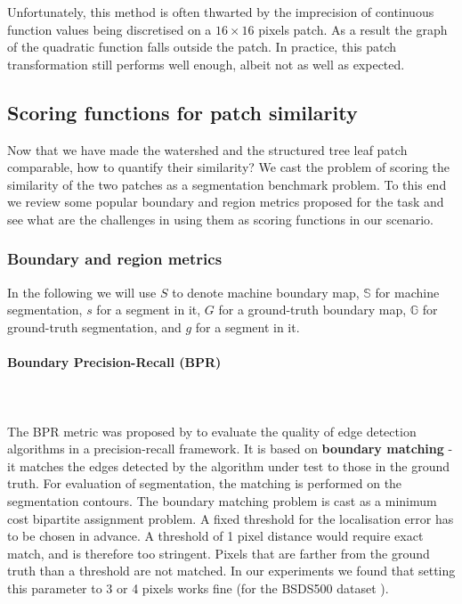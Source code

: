 Unfortunately, this method is often thwarted by the imprecision of continuous function values being discretised on a $16\times 16$ pixels patch. %
As a result the graph of the quadratic function falls outside the patch. In practice, this patch transformation still performs well enough, albeit not as well as expected.

\subsection{Scoring functions for patch similarity}
Now that we have made the watershed and the structured tree leaf patch comparable, how to quantify their similarity? 
We cast the problem of scoring the similarity of the two patches as a segmentation benchmark problem. To this end we review some popular boundary and region metrics proposed for the task and see what are the challenges in using them as scoring functions in our scenario.

\subsubsection{Boundary and region metrics}
\label{sec:ch4-boundary-and-region-metrics-maths}
In the following we will use $S$ to denote machine boundary map, $\mathbb{S}$ for machine segmentation, $s$ for a segment in it, $G$ for a ground-truth boundary map, $\mathbb{G}$ for ground-truth segmentation, and $g$ for a segment in it.

\paragraph{Boundary Precision-Recall (BPR)}\mbox{}\\\mbox{}\\
\label{par:ch4-BPR-maths}
The BPR metric was proposed by \cite{Martin2004learning} %
to evaluate the quality of edge detection algorithms in a precision-recall framework. 
It is based on {\bf boundary matching} - it matches the edges detected by the algorithm under test to those in the ground truth. For evaluation of segmentation, the matching is performed on the segmentation contours. The boundary matching problem is cast as a minimum cost bipartite assignment problem. A fixed threshold for the localisation error has to be chosen in advance. A threshold of 1 pixel distance would require exact match, and is therefore too stringent. Pixels that are farther from the ground truth than a threshold are not matched. In our experiments we found that setting this parameter to 3 or 4 pixels works fine (for the BSDS500 dataset \cite{BSDS500resources}).

